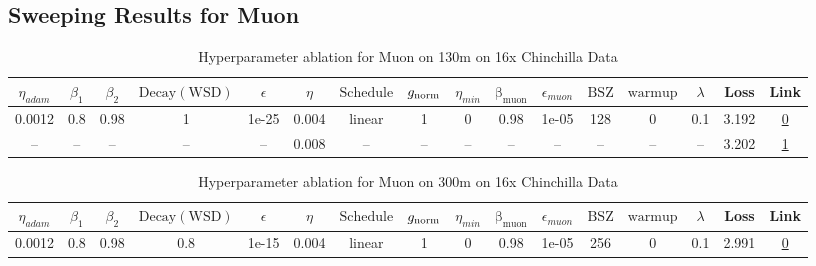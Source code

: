 \subsection{Sweeping Results for Muon}%
\begin{table}[H]
\centering
\caption{Hyperparameter ablation for Muon on 130m on 16x Chinchilla Data}
\label{tab:ablation_muon_130m_on_16x_chinchilla_data}
\begin{tabular}{cccccccccccccccc}
\toprule
$\eta_{adam}$ & $\beta_1$ & $\beta_2$ & $\mathrm{Decay (WSD)}$ & $\epsilon$ & $\eta$ & $\mathrm{Schedule}$ & $g_{\mathrm{norm}}$ & $\eta_{min}$ & $\mathrm{\beta_{muon}}$ & $\epsilon_{muon}$ & $\mathrm{BSZ}$ & $\mathrm{warmup}$ & $\lambda$ & Loss & Link \\
\midrule
0.0012 & 0.8 & 0.98 & 1 & 1e-25 & 0.004 & linear & 1 & 0 & 0.98 & 1e-05 & 128 & 0 & 0.1 & 3.192 & \href{https://wandb.ai/marin-community/optimizer-scaling/runs/sweep-130m-42B-muona84ae6lr0.004-wd0.1-minlr0-warmup0-b10.8-b20.-7e0789}{0} \\
\midrule
-- & -- & -- & -- & -- & 0.008 & -- & -- & -- & -- & -- & -- & -- & -- & 3.202 & \href{https://wandb.ai/marin-community/optimizer-scaling/runs/sweep-130m-42B-muoncedd383lr0.008-wd0.1-minlr0-warmup0-b10.8-b20-89555c}{1} \\
\bottomrule
\end{tabular}
\end{table}

\begin{table}[H]
\centering
\caption{Hyperparameter ablation for Muon on 300m on 16x Chinchilla Data}
\label{tab:ablation_muon_300m_on_16x_chinchilla_data}
\begin{tabular}{cccccccccccccccc}
\toprule
$\eta_{adam}$ & $\beta_1$ & $\beta_2$ & $\mathrm{Decay (WSD)}$ & $\epsilon$ & $\eta$ & $\mathrm{Schedule}$ & $g_{\mathrm{norm}}$ & $\eta_{min}$ & $\mathrm{\beta_{muon}}$ & $\epsilon_{muon}$ & $\mathrm{BSZ}$ & $\mathrm{warmup}$ & $\lambda$ & Loss & Link \\
\midrule
0.0012 & 0.8 & 0.98 & 0.8 & 1e-15 & 0.004 & linear & 1 & 0 & 0.98 & 1e-05 & 256 & 0 & 0.1 & 2.991 & \href{https://wandb.ai/marin-community/optimizer-scaling/runs/sweep-300m-96B-muonf26f61lr0.004-wd0.1-minlr0-warmup0-b10.8-b20.-ab5ce4}{0} \\
\midrule
\bottomrule
\end{tabular}
\end{table}

